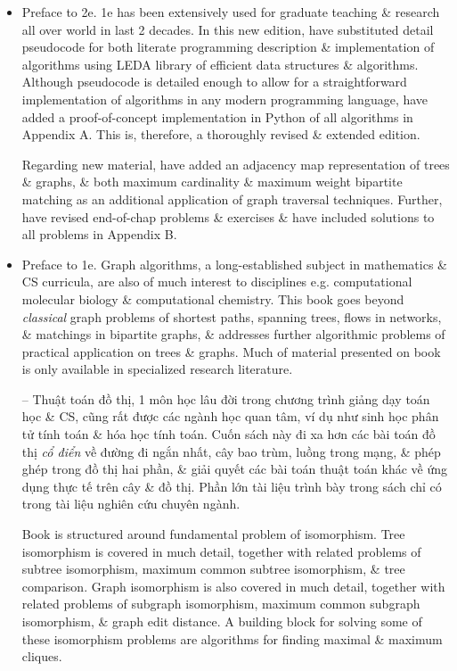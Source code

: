 \documentclass{article}
\begin{document}
\begin{itemize}
	\item {\sf Preface to 2e.} 1e has been extensively used for graduate teaching \& research all over world in last 2 decades. In this new edition, have substituted detail pseudocode for both literate programming description \& implementation of algorithms using LEDA library of efficient data structures \& algorithms. Although pseudocode is detailed enough to allow for a straightforward implementation of algorithms in any modern programming language, have added a proof-of-concept implementation in Python of all algorithms in Appendix A. This is, therefore, a thoroughly revised \& extended edition.
	
	Regarding new material, have added an adjacency map representation of trees \& graphs, \& both maximum cardinality \& maximum weight bipartite matching as an additional application of graph traversal techniques. Further, have revised end-of-chap problems \& exercises \& have included solutions to all problems in Appendix B.
	\item {\sf Preface to 1e.} Graph algorithms, a long-established subject in mathematics \& CS curricula, are also of much interest to disciplines e.g. computational molecular biology \& computational chemistry. This book goes beyond {\it classical} graph problems of shortest paths, spanning trees, flows in networks, \& matchings in bipartite graphs, \& addresses further algorithmic problems of practical application on trees \& graphs. Much of material presented on book is only available in specialized research literature.
	
	-- Thuật toán đồ thị, 1 môn học lâu đời trong chương trình giảng dạy toán học \& CS, cũng rất được các ngành học quan tâm, ví dụ như sinh học phân tử tính toán \& hóa học tính toán. Cuốn sách này đi xa hơn các bài toán đồ thị {\it cổ điển} về đường đi ngắn nhất, cây bao trùm, luồng trong mạng, \& phép ghép trong đồ thị hai phần, \& giải quyết các bài toán thuật toán khác về ứng dụng thực tế trên cây \& đồ thị. Phần lớn tài liệu trình bày trong sách chỉ có trong tài liệu nghiên cứu chuyên ngành.
	
	Book is structured around fundamental problem of isomorphism. Tree isomorphism is covered in much detail, together with related problems of subtree isomorphism, maximum common subtree isomorphism, \& tree comparison. Graph isomorphism is also covered in much detail, together with related problems of subgraph isomorphism, maximum common subgraph isomorphism, \& graph edit distance. A building block for solving some of these isomorphism problems are algorithms for finding maximal \& maximum cliques.
	

\end{itemize}
\end{document}
